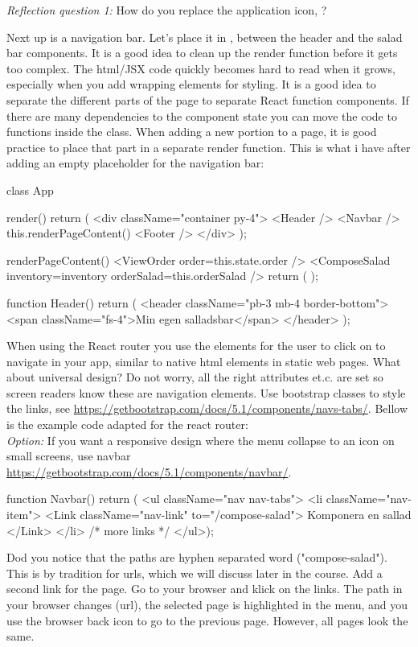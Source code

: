 \documentclass[fleqn, article, a4paper]{memoir}
\begin{document}
\begin{Assignments}
\noindent \emph{Reflection question 1:} How do you replace the application icon, ?

\item Next up is a navigation bar. Let's place it in , between the header and the salad bar components. It is a good idea to clean up the render function before it gets too complex. The html/JSX code quickly becomes hard to read when it grows, especially when you add wrapping  elements for styling. It is a good idea to separate the different parts of the page to separate React function components. If there are many dependencies to the component state you can move the code to functions inside the class. When adding a new portion to a page, it is good practice to place that part in a separate render function. This is what i have after adding an empty placeholder for the navigation bar:


\begin{Code}
class App {
  render() {
    return (
        <div className="container py-4">
          <Header />
          <Navbar />
          {this.renderPageContent()}
          <Footer />
        </div>
  );}
  
  renderPageContent(){
     <ViewOrder order={this.state.order} />
     <ComposeSalad inventory={inventory} orderSalad={this.orderSalad} />
    return (
    );
  }
}

function Header() {
  return (
    <header className="pb-3 mb-4 border-bottom">
      <span className="fs-4">Min egen salladsbar</span>
    </header>
  );
}
\end{Code}

\noindent When using the React router you use the  elements for the user to click on to navigate in your app, similar to native  html elements in static web pages. What about universal design? Do not worry, all the right  attributes et.c. are set so screen readers know these are navigation elements. Use bootstrap classes to style the links, see \url{https://getbootstrap.com/docs/5.1/components/navs-tabs/}. Bellow is the example code adapted for the react router:
\\ \emph{Option:} If you want a responsive design where the menu collapse to an icon on small screens, use navbar \url{https://getbootstrap.com/docs/5.1/components/navbar/}.

\begin{Code}
function Navbar() {
  return (
  <ul className="nav nav-tabs">
    <li className="nav-item">
      <Link className="nav-link" to="/compose-salad">
        Komponera en sallad
      </Link>
    </li>
    {/* more links */}
  </ul>);
}
\end{Code}
Dod you notice that the paths are hyphen separated word ("compose-salad"). This is by tradition for urls, which we will discuss later in the course. Add a second link for the  page. Go to your browser and klick on the links. The path in your browser changes (url), the selected page is highlighted in the menu, and you use the browser back icon to go to the previous page. However, all pages look the same.


\end{Assignments}
\end{document}
